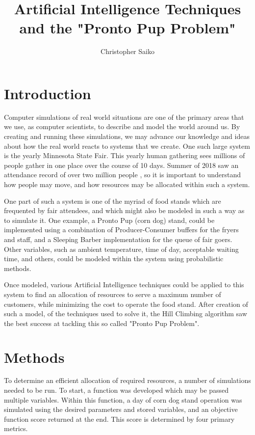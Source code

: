 \documentclass[10pt, twocolumn]{article}
\title{\vspace{-2.0cm} Artificial Intelligence Techniques and the "Pronto Pup Problem" }
\author{Christopher Saiko}
\begin{document}
\maketitle

\section{Introduction}

Computer simulations of real world situations are one of the primary areas that we use,
as computer scientists, to describe and model the world around us. By creating and running
these simulations, we may advance our knowledge and ideas about how the real world reacts
to systems that we create. One such large system is the yearly Minnesota State Fair. This
yearly human gathering sees millions of people gather in one place over the course of 10 days.
Summer of 2018 saw an attendance record of over two million people \cite{mnstatefair}, so
it is important to understand how people may move, and how resources may be allocated within
such a system.

One part of such a system is one of the myriad of food stands which are frequented by fair
attendees, and which might also be modeled in such a way as to simulate it. One example, a
Pronto Pup (corn dog) stand, could be implemented using a combination of Producer-Consumer buffers
for the fryers and staff, and a Sleeping Barber implementation \cite{sleepingbarber}
for the queue of fair goers. Other variables, such as ambient temperature, time of day,
acceptable waiting time, and others, could be modeled within the system using probabilistic methods.

Once modeled, various Artificial Intelligence techniques could be applied to this system
to find an allocation of resources to serve a maximum number of customers, while minimizing
the cost to operate the food stand. After creation of such a model, of the techniques used
to solve it, the Hill Climbing algorithm saw the best success at tackling
this so called "Pronto Pup Problem".

\section{Methods}

To determine an efficient allocation of required resources, a number of simulations
needed to be run. To start, a function was developed which may be passed multiple
variables. Within this function, a day of corn dog stand operation was simulated using
the desired parameters and stored variables, and an objective function score returned
at the end. This score is determined by four primary metrics.
\end{document}
